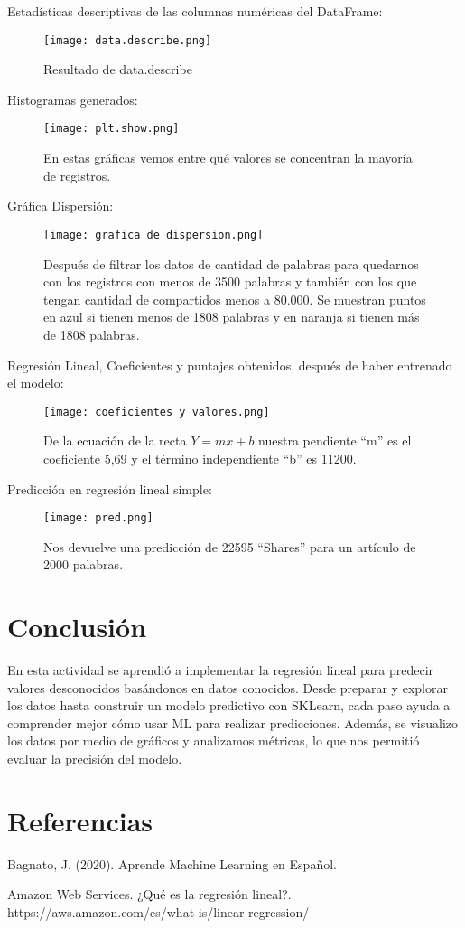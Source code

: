 \documentclass{pssbmac}
\begin{document}
Estadísticas descriptivas de las columnas numéricas del DataFrame:
\begin{figure}[H]
\centering
\texttt{[image: data.describe.png]}
\caption{ {\small Resultado de data.describe}}
\label{figura03}
\end{figure}
Histogramas generados:
\begin{figure}[H]
\centering
\texttt{[image: plt.show.png]}
\caption{ {\small En estas gráficas vemos entre qué valores se concentran la mayoría de registros.}}
\label{figura04}
\end{figure}


\vspace{5cm}
Gráfica Dispersión:

\begin{figure}[H]
\centering
\texttt{[image: grafica de dispersion.png]}
\caption{ {\small Después de filtrar los datos de cantidad de palabras para quedarnos con los registros con menos de 3500 palabras y también con los que tengan cantidad de compartidos menos a 80.000. Se muestran puntos en azul si tienen menos de 1808 palabras y en naranja si tienen más de 1808 palabras.}}
\label{figura05}
\end{figure}

Regresión Lineal, Coeficientes y puntajes obtenidos, después de haber entrenado el modelo:

\begin{figure}[H]
\centering
\texttt{[image: coeficientes y valores.png]}
\caption{ {\small De la ecuación de la recta \(Y=mx + b\) nuestra pendiente “m” es el coeficiente 5,69 y el término
independiente “b” es 11200.}}
\label{figura06}
\end{figure}

Predicción en regresión lineal simple:

\begin{figure}[H]
\centering
\texttt{[image: pred.png]}
\caption{ {\small Nos devuelve una predicción de 22595 “Shares” para un artículo de 2000 palabras.}}
\label{figura07}
\end{figure}

\section{Conclusión}

En esta actividad se aprendió a implementar la regresión lineal para predecir valores desconocidos basándonos en datos conocidos. Desde preparar y explorar los datos hasta construir un modelo predictivo con SKLearn, cada paso ayuda a comprender mejor cómo usar ML para realizar predicciones. Además, se visualizo los datos por medio de gráficos y analizamos métricas, lo que nos permitió evaluar la precisión del modelo.

\section{Referencias}
Bagnato, J. (2020). Aprende Machine Learning en Español.

\vspace{.3cm}
Amazon Web Services. ¿Qué es la regresión lineal?. https://aws.amazon.com/es/what-is/linear-regression/ 
\end{document}
